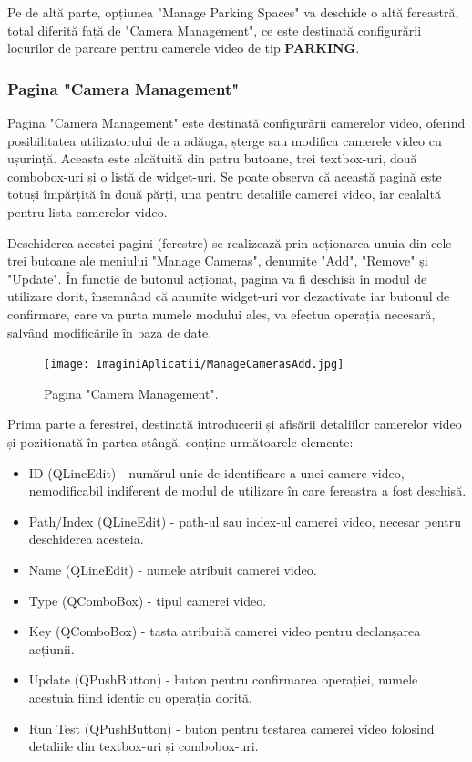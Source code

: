 \documentclass[12pt]{article}
\begin{document}
Pe de alt\u{a} parte, opțiunea "Manage Parking Spaces" va deschide o alt\u{a} fereastr\u{a}, total diferit\u{a} faț\u{a} de "Camera Management", ce este destinat\u{a} configur\u{a}rii locurilor de parcare pentru camerele video de tip \textbf{PARKING}.

\subsubsection{Pagina "Camera Management"}

Pagina "Camera Management" este destinat\u{a} configur\u{a}rii camerelor video, oferind posibilitatea utilizatorului de a ad\u{a}uga, șterge sau modifica camerele video cu ușurinț\u{a}. Aceasta este alc\u{a}tuit\u{a} din patru butoane, trei textbox-uri, dou\u{a} combobox-uri și o list\u{a} de widget-uri. Se poate observa c\u{a} aceast\u{a} pagin\u{a} este totuși \^{i}mp\u{a}rțit\u{a} \^{i}n dou\u{a} p\u{a}rți, una pentru detaliile camerei video, iar cealalt\u{a} pentru lista camerelor video.

Deschiderea acestei pagini (ferestre) se realizeaz\u{a} prin acționarea unuia din cele trei butoane ale meniului "Manage Cameras", denumite "Add", "Remove" și "Update". \^{I}n funcție de butonul acționat, pagina va fi deschis\u{a} \^{i}n modul de utilizare dorit, \^{i}nsemn\^{a}nd c\u{a} anumite widget-uri vor dezactivate iar butonul de confirmare, care va purta numele modului ales, va efectua operația necesar\u{a}, salv\^{a}nd modific\u{a}rile \^{i}n baza de date.

\begin{figure}[H]
  \centering
  \texttt{[image: ImaginiAplicatii/ManageCamerasAdd.jpg]}
  \caption{Pagina "Camera Management".}
  \label{fig:aplicatie_pagina_camera_management}
\end{figure}

Prima parte a ferestrei, destinat\u{a} introducerii și afis\u{a}rii detaliilor camerelor video și pozitionat\u{a} \^{i}n partea st\^{a}ng\u{a}, conține urm\u{a}toarele elemente: 

\begin{itemize}
    \item ID (QLineEdit) - num\u{a}rul unic de identificare a unei camere video, nemodificabil indiferent de modul de utilizare \^{i}n care fereastra a fost deschis\u{a}.
    \item Path/Index (QLineEdit) - path-ul sau index-ul camerei video, necesar pentru deschiderea acesteia.
    \item Name (QLineEdit) - numele atribuit camerei video.
    \item Type (QComboBox) - tipul camerei video.
    \item Key (QComboBox) - tasta atribuit\u{a} camerei video pentru declanșarea acțiunii.
    \item Update (QPushButton) - buton pentru confirmarea operației, numele acestuia fiind identic cu operația dorit\u{a}.
    \item Run Test (QPushButton) - buton pentru testarea camerei video folosind detaliile din textbox-uri și combobox-uri.
\end{itemize}
\end{document}
